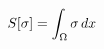 \documentclass[preview]{standalone}
\begin{document}
\begin{align*}
\special{dvisvgm:raw <g id='unique000'>}S[\sigma]=\int_\Omega\sigma\,dx\special{dvisvgm:raw </g>}
\end{align*}
\end{document}
